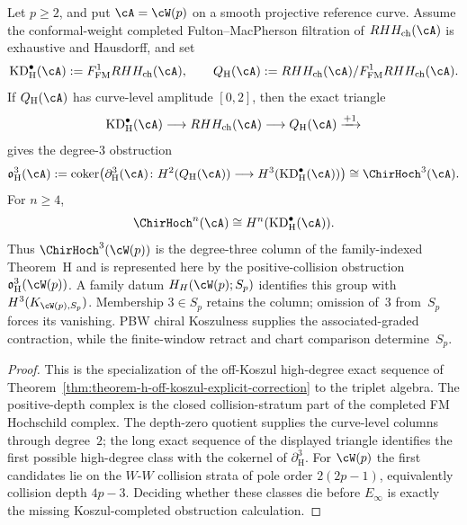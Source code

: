 \begin{proposition}\label{prop:wp-theorem-h-boundary}
Let $p\ge2$, and put $\cA=\cW(p)$ on a smooth projective
reference curve. Assume the conformal-weight completed
Fulton--MacPherson filtration of $RHH_{\mathrm{ch}}(\cA)$ is
exhaustive and Hausdorff, and set
\[
 \mathrm{KD}_{\mathrm H}^{\bullet}(\cA)
 :=F^1_{\mathrm{FM}}RHH_{\mathrm{ch}}(\cA),\qquad
 Q_{\mathrm H}(\cA)
 :=RHH_{\mathrm{ch}}(\cA)/F^1_{\mathrm{FM}}RHH_{\mathrm{ch}}(\cA).
\]
If $Q_{\mathrm H}(\cA)$ has curve-level amplitude $[0,2]$, then
the exact triangle
\[
 \mathrm{KD}_{\mathrm H}^{\bullet}(\cA)
 \longrightarrow RHH_{\mathrm{ch}}(\cA)
 \longrightarrow Q_{\mathrm H}(\cA)
 \xrightarrow{+1}
\]
gives the degree-$3$ obstruction
\[
 \mathfrak{o}_{\mathrm H}^{3}(\cA)
 :=
 \operatorname{coker}\!\left(
  \partial_{\mathrm H}^{3}(\cA)\colon
  H^2(Q_{\mathrm H}(\cA))
  \longrightarrow
  H^3(\mathrm{KD}_{\mathrm H}^{\bullet}(\cA))
 \right)
 \cong \ChirHoch^3(\cA).
\]
For $n\ge4$,
\[
 \ChirHoch^n(\cA)
 \cong H^n(\mathrm{KD}_{\mathrm H}^{\bullet}(\cA)).
\]
Thus $\ChirHoch^3(\cW(p))$ is the degree-three column of the
family-indexed Theorem~H and is represented here by the
positive-collision obstruction
$\mathfrak{o}_{\mathrm H}^{3}(\cW(p))$.  A family datum
$H_H(\cW(p);S_p)$ identifies this group with
$H^3(K_{\cW(p),S_p})$.  Membership $3\in S_p$ retains the column;
omission of~$3$ from~$S_p$ forces its vanishing.  PBW chiral
Koszulness supplies the associated-graded contraction, while the
finite-window retract and chart comparison determine~$S_p$.
\end{proposition}

\begin{proof}
This is the specialization of the off-Koszul high-degree exact
sequence of
Theorem~\ref{thm:theorem-h-off-koszul-explicit-correction} to the
triplet algebra. The positive-depth complex is the closed
collision-stratum part of the completed FM Hochschild complex. The
depth-zero quotient supplies the curve-level columns through
degree~$2$; the
long exact sequence of the displayed triangle identifies the first
possible high-degree class with the cokernel of
$\partial_{\mathrm H}^{3}$. For $\cW(p)$ the first candidates lie on
the $W$-$W$ collision strata of pole order $2(2p-1)$, equivalently
collision depth $4p-3$. Deciding whether these classes die before
$E_\infty$ is exactly the missing Koszul-completed obstruction
calculation.
\end{proof}

